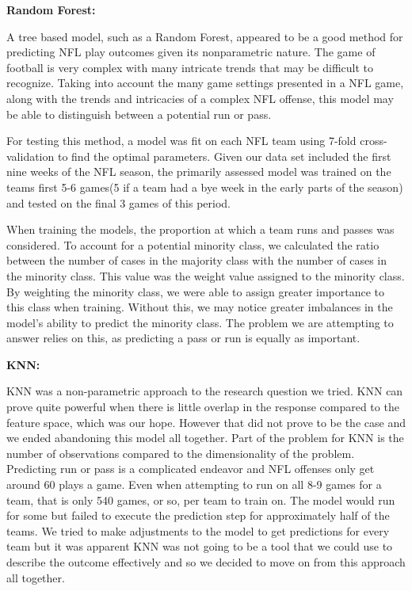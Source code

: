 \documentclass[
]{article}
\begin{document}
\textbf{Random Forest:}

A tree based model, such as a Random Forest, appeared to be a good
method for predicting NFL play outcomes given its nonparametric nature.
The game of football is very complex with many intricate trends that may
be difficult to recognize. Taking into account the many game settings
presented in a NFL game, along with the trends and intricacies of a
complex NFL offense, this model may be able to distinguish between a
potential run or pass.

For testing this method, a model was fit on each NFL team using 7-fold
cross-validation to find the optimal parameters. Given our data set
included the first nine weeks of the NFL season, the primarily assessed
model was trained on the teams first 5-6 games(5 if a team had a bye
week in the early parts of the season) and tested on the final 3 games
of this period.

When training the models, the proportion at which a team runs and passes
was considered. To account for a potential minority class, we calculated
the ratio between the number of cases in the majority class with the
number of cases in the minority class. This value was the weight value
assigned to the minority class. By weighting the minority class, we were
able to assign greater importance to this class when training. Without
this, we may notice greater imbalances in the model's ability to predict
the minority class. The problem we are attempting to answer relies on
this, as predicting a pass or run is equally as important.

\textbf{KNN:}

KNN was a non-parametric approach to the research question we tried. KNN
can prove quite powerful when there is little overlap in the response
compared to the feature space, which was our hope. However that did not
prove to be the case and we ended abandoning this model all together.
Part of the problem for KNN is the number of observations compared to
the dimensionality of the problem. Predicting run or pass is a
complicated endeavor and NFL offenses only get around 60 plays a game.
Even when attempting to run on all 8-9 games for a team, that is only
540 games, or so, per team to train on. The model would run for some but
failed to execute the prediction step for approximately half of the
teams. We tried to make adjustments to the model to get predictions for
every team but it was apparent KNN was not going to be a tool that we
could use to describe the outcome effectively and so we decided to move
on from this approach all together.
\end{document}
